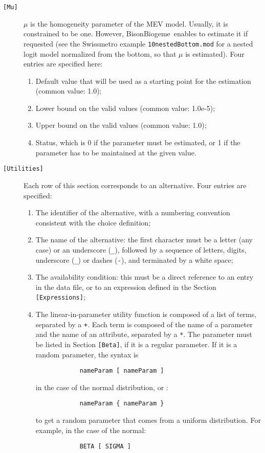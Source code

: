 \documentclass[12pt,a4paper]{article}
\newcommand{\specitem}[1]{\texttt{[#1]}}
\newcommand{\BBIOGEME}{BisonBiogeme}
\begin{document}
\begin{description}
   \item[\specitem{Mu}] $\mu$ is the homogeneity parameter of the MEV
      model. Usually, it is constrained to be one. However, \BBIOGEME\  enables to
      estimate it if requested (see the Swissmetro example \verb+10nestedBottom.mod+ for a nested logit model normalized from the bottom, so that $\mu$ is estimated). Four entries are specified here:
      \begin{enumerate}
         \item Default value that will be used as a starting point for the estimation (common value: 1.0);
         \item Lower bound on the valid values (common value: 1.0e-5);
         \item Upper bound on the valid values (common value: 1.0);
         \item Status, which is 0 if the parameter must be estimated, or 1 if the parameter 
            has to be maintained at the given value. 
      \end{enumerate}

   \item[\specitem{Utilities}] Each row of this section corresponds to an
      alternative. Four entries are specified:
     \begin{enumerate}
      \item The identifier of the alternative, with a numbering convention
         consistent with the choice definition;
      \item The name of the alternative:  the first character must be a letter (any case) or an 
         underscore (\verb+_+), followed by a sequence of letters, digits, underscore (\verb+_+)
         or dashes (\verb+-+), and terminated by a white space;
      \item The availability condition: this must be a direct reference to an entry
         in the data file, or to an expression defined in the
         Section \verb+[Expressions]+;
      \item The linear-in-parameter utility function is composed of a list of terms,
         separated by a \verb-+-. Each term is composed of the name of a
         parameter and the name of an attribute,
         separated by a \verb+*+. The parameter must be listed in
         Section \verb+[Beta]+, if it is a regular parameter. If it
         is a random parameter, the syntax is
         \begin{verbatim}
            nameParam [ nameParam ] 
         \end{verbatim}
         in the case of the normal distribution, or :
         \begin{verbatim}
            nameParam { nameParam }
         \end{verbatim}
         to get a random parameter that comes from a uniform distribution.  For example, 
         in the case of the normal:
         \begin{verbatim}
            BETA [ SIGMA ] 
         \end{verbatim}


\end{enumerate}
\end{description}
\end{document}
